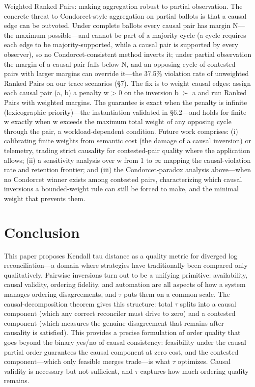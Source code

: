 \documentclass[journal]{IEEEtran}
\begin{document}
Weighted Ranked Pairs: making aggregation robust to partial observation. The concrete threat to Condorcet-style aggregation on partial ballots is that a causal edge can be outvoted. Under complete ballots every causal pair has margin N—the maximum possible—and cannot be part of a majority cycle (a cycle requires each edge to be majority-supported, while a causal pair is supported by every observer), so no Condorcet-consistent method inverts it; under partial observation the margin of a causal pair falls below N, and an opposing cycle of contested pairs with larger margins can override it—the 37.5\% violation rate of unweighted Ranked Pairs on our trace scenarios (§7). The fix is to weight causal edges: assign each causal pair (a, b) a penalty w > 0 on the inversion b $\succ$ a and run Ranked Pairs with weighted margins. The guarantee is exact when the penalty is infinite (lexicographic priority)—the instantiation validated in §6.2—and holds for finite w exactly when w exceeds the maximum total weight of any opposing cycle through the pair, a workload-dependent condition. Future work comprises: (i) calibrating finite weights from semantic cost (the damage of a causal inversion) or telemetry, trading strict causality for contested-pair quality where the application allows; (ii) a sensitivity analysis over w from 1 to $\infty$ mapping the causal-violation rate and retention frontier; and (iii) the Condorcet-paradox analysis above—when no Condorcet winner exists among contested pairs, characterizing which causal inversions a bounded-weight rule can still be forced to make, and the minimal weight that prevents them.

\section{Conclusion}
This paper proposes Kendall tau distance as a quality metric for diverged log reconciliation—a domain where strategies have traditionally been compared only qualitatively. Pairwise inversions turn out to be a unifying primitive: availability, causal validity, ordering fidelity, and automation are all aspects of how a system manages ordering disagreements, and $\tau$ puts them on a common scale. The causal-decomposition theorem gives this structure: total $\tau$ splits into a causal component (which any correct reconciler must drive to zero) and a contested component (which measures the genuine disagreement that remains after causality is satisfied). This provides a precise formulation of order quality that goes beyond the binary yes/no of causal consistency: feasibility under the causal partial order guarantees the causal component at zero cost, and the contested component—which only feasible merges trade—is what $\tau$ optimizes. Causal validity is necessary but not sufficient, and $\tau$ captures how much ordering quality remains.
\end{document}
